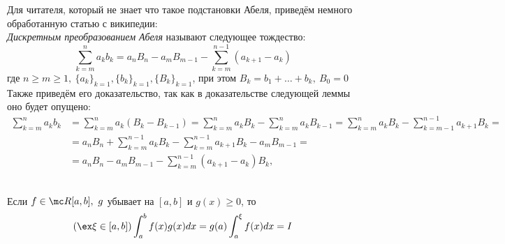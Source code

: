 \begin{anote}
	Для читателя, который не знает что такое подстановки Абеля, приведём немного обработанную статью с википедии:\\
	\textit{Дискретным преобразованием Абеля} называют следующее тождество:
	\[\sum_{k=m}^na_kb_k=a_nB_n-a_mB_{m-1}-\sum_{k=m}^{n-1}(a_{k+1}-a_k)\]
	где $n\ge m\ge 1,\ \{a_k\}_{k=1},\{b_k\}_{k=1},\{B_k\}_{k=1}$, при этом $B_k=b_1+\dots+b_k,\ B_0=0$\\
	Также приведём его доказательство, так как в доказательстве следующей леммы оно будет опущено:
	\begin{equation*}
		\begin{split}
			\sum_{k=m}^n a_kb_k &=\sum_{k=m}^n a_k(B_k-B_{k-1})=\sum_{k=m}^n a_k B_k - \sum_{k=m}^n a_kB_{k-1}=\sum_{k=m}^n a_k B_k - \sum_{k=m-1}^{n-1} a_{k+1} B_k = \\
			&= a_n B_n + \sum_{k=m}^{n-1} a_k B_k - \sum_{k=m}^{n-1} a_{k+1} B_k - a_m B_{m-1} = \\
			&= a_n B_n - a_m B_{m-1} - \sum_{k=m}^{n-1}(a_{k+1} - a_k) B_k,
		\end{split}
	\end{equation*}
\end{anote}
\begin{lemma}\label{10_le1}\\
	Если $f\in\mc R[a,b],\ g$ убывает на $[a,b]$ и $g(x)\ge0$, то
	\[(\ex\xi\in[a,b])\int_a^bf(x)g(x)dx=g(a)\int_a^\xi f(x)dx=I\]
\end{lemma}
